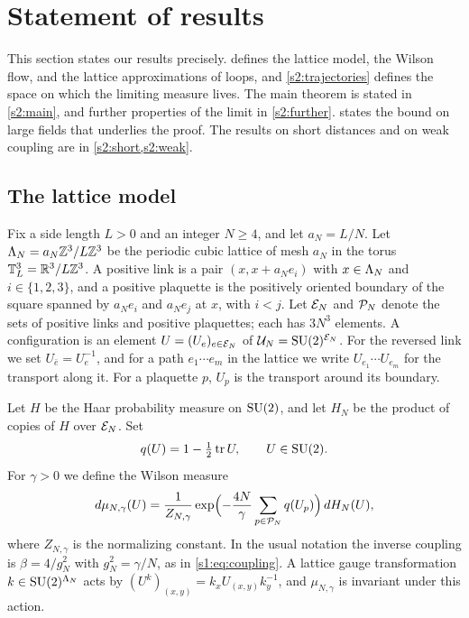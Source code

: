 \chapter{Statement of results}\label{s2:chapter}

This section states our results precisely.  defines the lattice model, the Wilson flow, and the lattice approximations of loops, and \cref{s2:trajectories} defines the space on which the limiting measure lives. The main theorem is stated in \cref{s2:main}, and further properties of the limit in \cref{s2:further}.  states the bound on large fields that underlies the proof. The results on short distances and on weak coupling are in \cref{s2:short,s2:weak}.

\section{The lattice model}\label{s2:model}

Fix a side length $L>0$ and an integer $N\ge4$, and let $a_N=L/N$. Let $\Lambda_{N}=a_N\mathbb Z^3/L\mathbb Z^3$ be the periodic cubic lattice of mesh $a_N$ in the torus $\mathbb T_L^3=\mathbb R^3/L\mathbb Z^3$. A positive link is a pair $(x,x+a_Ne_i)$ with $x\in\Lambda_{N}$ and $i\in\{1,2,3\}$, and a positive plaquette is the positively oriented boundary of the square spanned by $a_Ne_i$ and $a_Ne_j$ at $x$, with $i<j$. Let $\mathcal E_{N}$ and $\mathcal P_{N}$ denote the sets of positive links and positive plaquettes; each has $3N^3$ elements. A configuration is an element $U=(U_e)_{e\in\mathcal E_{N}}$ of $\mathcal U_{N}=\mathrm{SU}(2)^{\mathcal E_{N}}$. For the reversed link we set $U_{\bar e}=U_e^{-1}$, and for a path $e_1\cdots e_m$ in the lattice we write $U_{e_1}\cdots U_{e_m}$ for the transport along it. For a plaquette $p$, $U_p$ is the transport around its boundary.

Let $H$ be the Haar probability measure on $\mathrm{SU}(2)$, and let $H_N$ be the product of copies of $H$ over $\mathcal E_{N}$. Set
\[
 q(U)=1-\tfrac12\operatorname{tr} U,\qquad U\in\mathrm{SU}(2).
\]
For $\gamma>0$ we define the Wilson measure
\begin{equation}\label{s2:eq:wilson}
 d\mu_{N,\gamma}(U)=\frac{1}{Z_{N,\gamma}}\exp\Bigl(-\frac{4N}{\gamma}\sum_{p\in\mathcal P_{N}}q(U_p)\Bigr)\,dH_N(U),
\end{equation}
where $Z_{N,\gamma}$ is the normalizing constant. In the usual notation the inverse coupling is $\beta=4/g_N^2$ with $g_N^2=\gamma/N$, as in \eqref{s1:eq:coupling}. A lattice gauge transformation $k\in\mathrm{SU}(2)^{\Lambda_{N}}$ acts by $(U^k)_{(x,y)}=k_xU_{(x,y)}k_y^{-1}$, and $\mu_{N,\gamma}$ is invariant under this action.

